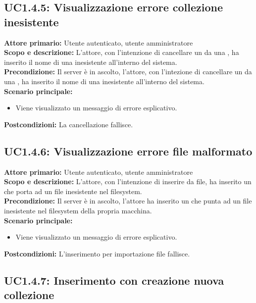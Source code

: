 \documentclass{scalatekids-article}
\begin{document}
\subsection{UC1.4.5: Visualizzazione errore collezione inesistente}

\textbf{Attore primario:} Utente autenticato, utente amministratore\\
\textbf{Scopo e descrizione:} L'attore, con l'intenzione di cancellare un  da una , ha inserito il nome di una  inesistente
all'interno del sistema.\\
\textbf{Precondizione:} Il server è in ascolto, l'attore, con l'intezione di cancellare un  da una , ha inserito il nome di una  inesistente
all'interno del sistema.\\
\textbf{Scenario principale:}
\begin{itemize}
\item Viene visualizzato un messaggio di errore esplicativo.
\end{itemize}
\textbf{Postcondizioni:} La cancellazione  fallisce.

\subsection{UC1.4.6: Visualizzazione errore file malformato}

\textbf{Attore primario:} Utente autenticato, utente amministratore\\
\textbf{Scopo e descrizione:} L'attore, con l'intenzione di inserire  da file, ha inserito un  che porta ad un file inesistente nel filesystem.\\
\textbf{Precondizione:} Il server è in ascolto, l'attore ha inserito un  che punta ad un file inesistente nel filesystem della propria macchina.\\
\textbf{Scenario principale:}
\begin{itemize}
\item Viene visualizzato un messaggio di errore esplicativo.
\end{itemize}
\textbf{Postcondizioni:} L'inserimento per importazione file fallisce.

\subsection{UC1.4.7: Inserimento con creazione nuova collezione}
\end{document}
